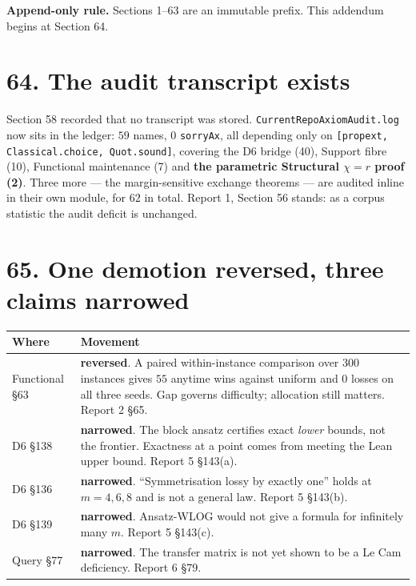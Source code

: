 \documentclass[9pt,twocolumn]{article}
\renewcommand{\_}{\CIGunderscore\allowbreak}
\begin{document}
\sloppy
{}

\textbf{Append-only rule.} Sections 1--63 are an immutable prefix. This addendum begins at Section 64.

\section*{64. The audit transcript exists}
Section 58 recorded that no transcript was stored. \texttt{CurrentRepoAxiomAudit.log} now sits in the ledger: $59$ names, $0$ \texttt{sorryAx}, all depending only on \texttt{[propext, Classical.choice, Quot.sound]}, covering the D6 bridge (40), Support fibre (10), Functional maintenance (7) and \textbf{the parametric Structural $\chi=r$ proof (2)}. Three more --- the margin-sensitive exchange theorems --- are audited inline in their own module, for $62$ in total. Report 1, Section 56 stands: as a corpus statistic the audit deficit is unchanged.

\section*{65. One demotion reversed, three claims narrowed}
\begin{center}\scriptsize
\begin{tabularx}{0.98\columnwidth}{>{\raggedright\arraybackslash}p{}X}
\toprule
Where & Movement\\
\midrule
Functional §63 & \textbf{reversed}. A paired within-instance comparison over $300$ instances gives $55$ anytime wins against uniform and $0$ losses on all three seeds. Gap governs difficulty; allocation still matters. Report 2 §65.\\
D6 §138 & \textbf{narrowed}. The block ansatz certifies exact \emph{lower} bounds, not the frontier. Exactness at a point comes from meeting the Lean upper bound. Report 5 §143(a).\\
D6 §136 & \textbf{narrowed}. ``Symmetrisation lossy by exactly one'' holds at $m=4,6,8$ and is not a general law. Report 5 §143(b).\\
D6 §139 & \textbf{narrowed}. Ansatz-WLOG would not give a formula for infinitely many $m$. Report 5 §143(c).\\
Query §77 & \textbf{narrowed}. The transfer matrix is not yet shown to be a Le Cam deficiency. Report 6 §79.\\
\bottomrule
\end{tabularx}
\end{center}
\end{document}
